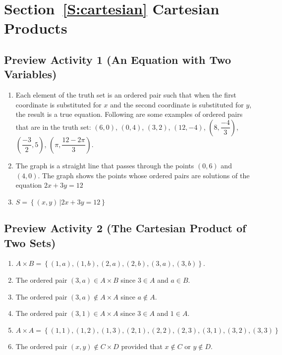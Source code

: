 \section*{Section~\ref{S:cartesian} Cartesian Products}
\subsection*{Preview Activity 1 (An Equation with Two Variables)}
\begin{enumerate}
\item Each element of the truth set is an ordered pair such that when the first coordinate is substituted for  $x$  and the second coordinate is substituted for  $y$, the result is a true equation.  Following are some examples of ordered pairs that are in the truth set:  
$( {6, 0} )$, $( {0, 4} )$, $( {3, 2} )$, 
$( {12,  - 4} )$, $\left( {8, \dfrac{{ - 4}}{3}} \right)$, 
$\left( {\dfrac{{ - 3}}{2}, 5} \right)$, $\left( {\pi , \dfrac{{12 - 2\pi }}{3}} \right)$.

\item The graph is a straight line that passes through the points $( 0, 6 )$ and 
$( 4, 0 )$.  The graph shows the points whose ordered pairs are solutions of the equation  $2x + 3y = 12$

\item $S = \left\{ {\left. {( {x, y} )\,} \right| 2x + 3y = 12} \right\}$
\end{enumerate}
\hbreak



\subsection*{Preview Activity 2 (The Cartesian Product of Two Sets)}
\begin{enumerate}
\item $A \times B = \left\{ {( {1, a} ), ( {1, b} ), ( {2, a} ), ( {2, b} ), ( {3, a} ), ( {3, b} )} \right\}$.

\item The ordered pair  $( {3, a} ) \in A \times B$  since  $3 \in A$  and  $a \in B$.

\item The ordered pair  $( {3, a} ) \notin A \times A$  since  $a \notin A$.

\item The ordered pair $( {3, 1} ) \in A \times A$  since  $3 \in A$  and  $1 \in A$.

\item $A \times A = \left\{ {( {1, 1} ), ( {1, 2} ), ( {1, 3} ), ( {2, 1} ), ( {2, 2} ), ( {2, 3} ), ( {3, 1} ), ( {3, 2} ), ( {3, 3} )} \right\}$

\item The ordered pair  $( {x, y} ) \notin C \times D$  provided that  
$x \notin C$ or $y \notin D$.
\end{enumerate}
\hbreak



\newpage

\endinput
